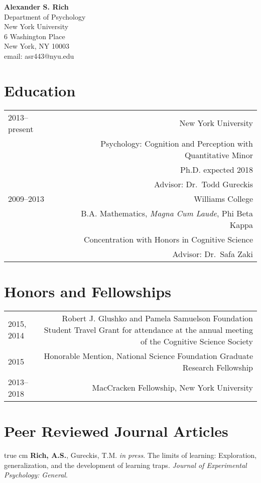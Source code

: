 \documentclass[12pt]{my_cv}
\def\ind{\hangindent=1 true cm\hangafter=1 \noindent}
\begin{document}
\noindent \textbf{\sffamily\Large Alexander S. Rich}\vspace{1em}\\
Department of Psychology\\
New York University\\
6 Washington Place\\
 New York, NY 10003\\
email: asr443@nyu.edu\\

\section{Education}
\begin{tabular}{L R}
2013--present&New York University\\
&Psychology: Cognition and Perception with Quantitative Minor\\
&Ph.D. expected 2018\\
&Advisor: Dr.\ Todd Gureckis \vspace{1em}\\ 
2009--2013&Williams College\\
&B.A. Mathematics, \emph{Magna Cum Laude}, Phi Beta Kappa\\
&Concentration with Honors in Cognitive Science\\
&Advisor: Dr.\ Safa Zaki\\
\end{tabular}

\section{Honors and Fellowships}
\begin{tabular}{L R}
2015, 2014&Robert J. Glushko and Pamela Samuelson Foundation Student Travel Grant for attendance at the annual meeting of the Cognitive Science Society\\[1ex]
2015&Honorable Mention, National Science Foundation Graduate Research Fellowship\\[1ex]
2013--2018&MacCracken Fellowship, New York University\\
\end{tabular}

\section{Peer Reviewed Journal Articles}

\ind \textbf{Rich, A.S.}, Gureckis, T.M. \emph{in press}. The limits of learning:
Exploration, generalization, and the development of learning traps.
\emph{Journal of Experimental Psychology: General}.
\end{document}
